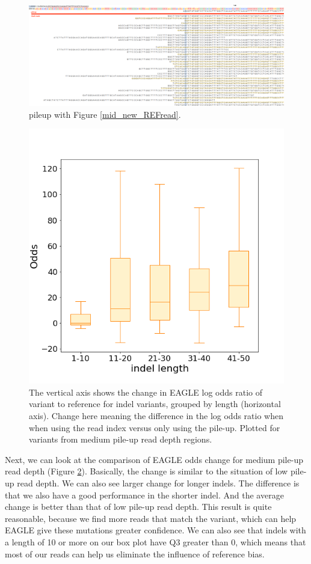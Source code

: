 \begin{figure}[H]
\centering
\includegraphics[width=1\columnwidth]{body/image/mid_pileup_REFread.png}
\caption[pileup with Figure \ref{mid_new_REFread}]{pileup with Figure \ref{mid_new_REFread}.}
\label{mid_pileup_REFread}
\end{figure}


\begin{figure}[H]
\centering
\includegraphics[width=0.6\columnwidth]{body/image/mid_odds_change.png}
\caption[medium pile-up read depth odds change ratio]{The vertical axis shows the change in EAGLE log odds ratio of variant to reference for indel variants, grouped by length (horizontal axis).  Change here meaning the difference in the log odds ratio when when using the read index versus only using the pile-up.  Plotted for variants from medium pile-up read depth regions.}
\label{mid_odds_change}
\end{figure}

Next, we can look at the comparison of EAGLE odds change for medium pile-up read depth (Figure \ref{mid_odds_change}). Basically, the change is similar to the situation of low pile-up read depth. We can also see larger change for longer indels. The difference is that we also have a good performance in the shorter indel. And the average change is better than that of low pile-up read depth. This result is quite reasonable, because we find more reads that match the variant, which can help EAGLE give these mutations greater confidence.
We can also see that indels with a length of 10 or more on our box plot have Q3 greater than 0, which means that most of our reads can help us eliminate the influence of reference bias.

